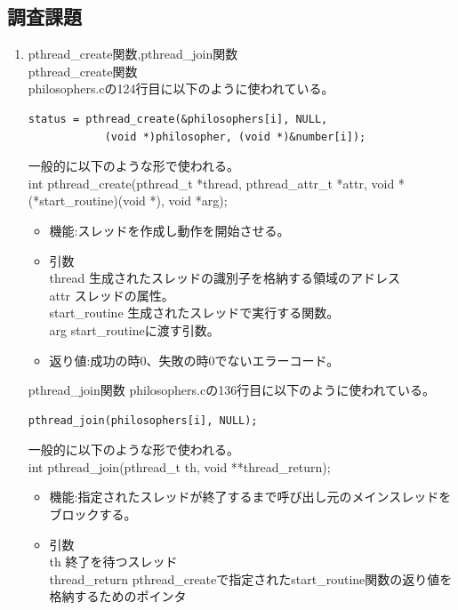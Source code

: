\documentclass[a4j]{celb-report}
\begin{document}
\subsection{調査課題}
\begin{enumerate}
 \renewcommand{\labelenumi}{(\arabic{enumi})}
 \item pthread\_create関数,pthread\_join関数\\
  pthread\_create関数\\
  philosophers.cの124行目に以下のように使われている。
  \begin{lstlisting}[basicstyle=\ttfamily\footnotesize, frame=single]
        status = pthread_create(&philosophers[i], NULL, 
            (void *)philosopher, (void *)&number[i]);
  \end{lstlisting}
  一般的に以下のような形で使われる。\\
  int pthread\_create(pthread\_t *thread, pthread\_attr\_t *attr, void *(*start\_routine)(void *), void *arg);
  \begin{itemize}
   \item 機能:スレッドを作成し動作を開始させる。
   \item 引数\\
   thread 生成されたスレッドの識別子を格納する領域のアドレス\\
   attr	スレッドの属性。\\
   start\_routine 生成されたスレッドで実行する関数。\\
   arg start\_routineに渡す引数。
   \item 返り値:成功の時0、失敗の時0でないエラーコード。
  \end{itemize}
  pthread\_join関数
  philosophers.cの136行目に以下のように使われている。
  \begin{lstlisting}[basicstyle=\ttfamily\footnotesize, frame=single]
        pthread_join(philosophers[i], NULL);
  \end{lstlisting}
  一般的に以下のような形で使われる。\\
  int pthread\_join(pthread\_t th, void **thread\_return);
  \begin{itemize}
   \item 機能:指定されたスレッドが終了するまで呼び出し元のメインスレッドをブロックする。
   \item 引数\\
    th 終了を待つスレッド\\
    thread\_return pthread\_createで指定されたstart\_routine関数の返り値を格納するためのポインタ\\

\end{itemize}
\end{enumerate}
\end{document}
